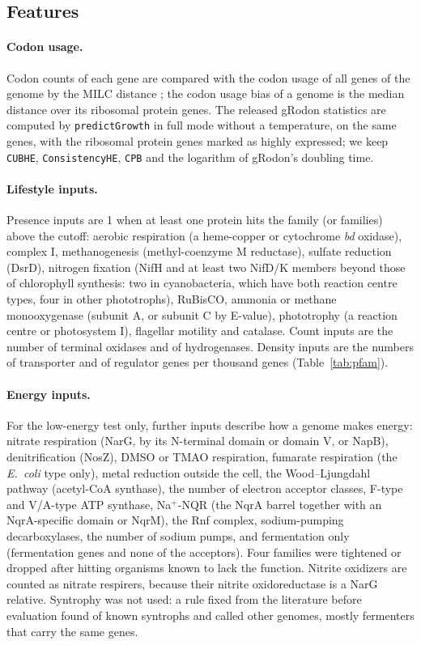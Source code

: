 \subsection{Features}
\paragraph{Codon usage.} Codon counts of each gene are compared with the codon usage of all genes of the genome by the MILC
distance \citep{supek2005}; the codon usage bias of a genome is the median distance over its ribosomal protein genes. The
released gRodon statistics are computed by \texttt{predictGrowth} in full mode without a temperature, on the same genes,
with the ribosomal protein genes marked as highly expressed; we keep \texttt{CUBHE}, \texttt{ConsistencyHE}, \texttt{CPB}
and the logarithm of gRodon's doubling time.

\paragraph{Lifestyle inputs.} Presence inputs are 1 when at least one protein hits the family (or families) above the
cutoff: aerobic respiration (a heme-copper or cytochrome \textit{bd} oxidase), complex I, methanogenesis (methyl-coenzyme
M reductase), sulfate reduction (DsrD), nitrogen fixation (NifH and at least two NifD/K members beyond those of chlorophyll
synthesis: two in cyanobacteria, which have both reaction centre types, four in other phototrophs), RuBisCO, ammonia or
methane monooxygenase (subunit A, or subunit C by E-value), phototrophy (a reaction centre or photosystem I), flagellar
motility and catalase. Count inputs are the number of terminal oxidases and of hydrogenases. Density inputs are the
numbers of transporter and of regulator genes per thousand genes (Table~\ref{tab:pfam}).

\paragraph{Energy inputs.} For the low-energy test only, \NEnergyFeatures further inputs describe how a genome makes
energy: nitrate respiration (NarG, by its N-terminal domain or domain V, or NapB), denitrification (NosZ), DMSO or TMAO
respiration, fumarate respiration (the \textit{E.~coli} type only), metal reduction outside the cell, the Wood--Ljungdahl
pathway (acetyl-CoA synthase), the number of electron acceptor classes, F-type and V/A-type ATP synthase, Na$^+$-NQR
(the NqrA barrel together with an NqrA-specific domain or NqrM), the Rnf complex, sodium-pumping decarboxylases, the number
of sodium pumps, and fermentation only (fermentation genes and none of the acceptors). Four families were tightened or
dropped after hitting organisms known to lack the function. Nitrite oxidizers are counted as nitrate respirers, because their
nitrite oxidoreductase is a NarG relative. Syntrophy was not used: a rule fixed from the literature before evaluation found
\SynFoundWord of \SynKnownWord known syntrophs and called \SynFalse other genomes, mostly fermenters that carry the same genes.

